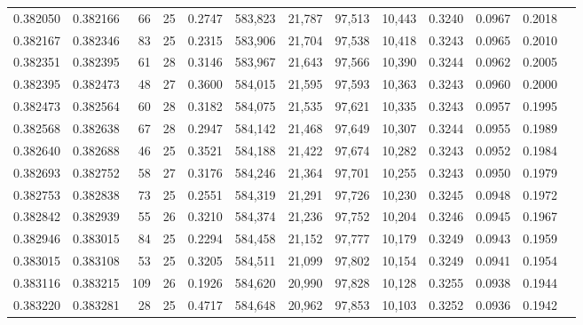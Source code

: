 \begin{tabular}{rrrrrrrrrrrrr}
0.382050 & 0.382166 &    66 &  25 &                                     0.2747 & 583,823 &  21,787 &  97,513 &  10,443 & 0.3240 & 0.0967 & 0.2018 \\
0.382167 & 0.382346 &    83 &  25 &                                     0.2315 & 583,906 &  21,704 &  97,538 &  10,418 & 0.3243 & 0.0965 & 0.2010 \\
0.382351 & 0.382395 &    61 &  28 &                                     0.3146 & 583,967 &  21,643 &  97,566 &  10,390 & 0.3244 & 0.0962 & 0.2005 \\
0.382395 & 0.382473 &    48 &  27 &                                     0.3600 & 584,015 &  21,595 &  97,593 &  10,363 & 0.3243 & 0.0960 & 0.2000 \\
0.382473 & 0.382564 &    60 &  28 &                                     0.3182 & 584,075 &  21,535 &  97,621 &  10,335 & 0.3243 & 0.0957 & 0.1995 \\
0.382568 & 0.382638 &    67 &  28 &                                     0.2947 & 584,142 &  21,468 &  97,649 &  10,307 & 0.3244 & 0.0955 & 0.1989 \\
0.382640 & 0.382688 &    46 &  25 &                                     0.3521 & 584,188 &  21,422 &  97,674 &  10,282 & 0.3243 & 0.0952 & 0.1984 \\
0.382693 & 0.382752 &    58 &  27 &                                     0.3176 & 584,246 &  21,364 &  97,701 &  10,255 & 0.3243 & 0.0950 & 0.1979 \\
0.382753 & 0.382838 &    73 &  25 &                                     0.2551 & 584,319 &  21,291 &  97,726 &  10,230 & 0.3245 & 0.0948 & 0.1972 \\
0.382842 & 0.382939 &    55 &  26 &                                     0.3210 & 584,374 &  21,236 &  97,752 &  10,204 & 0.3246 & 0.0945 & 0.1967 \\
0.382946 & 0.383015 &    84 &  25 &                                     0.2294 & 584,458 &  21,152 &  97,777 &  10,179 & 0.3249 & 0.0943 & 0.1959 \\
0.383015 & 0.383108 &    53 &  25 &                                     0.3205 & 584,511 &  21,099 &  97,802 &  10,154 & 0.3249 & 0.0941 & 0.1954 \\
0.383116 & 0.383215 &   109 &  26 &                                     0.1926 & 584,620 &  20,990 &  97,828 &  10,128 & 0.3255 & 0.0938 & 0.1944 \\
0.383220 & 0.383281 &    28 &  25 &                                     0.4717 & 584,648 &  20,962 &  97,853 &  10,103 & 0.3252 & 0.0936 & 0.1942 \\

\end{tabular}
